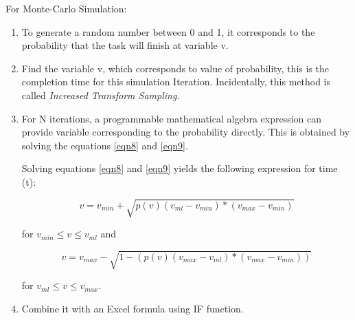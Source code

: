 For Monte-Carlo Simulation:

\begin{enumerate}
	\item To generate a random number between 0 and 1, it corresponds to the probability that the task will finish at variable {v}.
	\item Find the variable {v}, which corresponds to value of probability, this is the completion time for this simulation Iteration. Incidentally, this method is called \emph{Increased Transform Sampling}.
	\item For N iterations, a programmable mathematical algebra expression can provide variable corresponding to the probability directly. This is obtained by solving the equations \ref{eqn8} and  \ref{eqn9}.
	
	Solving equations \ref{eqn8} and  \ref{eqn9} yields the following expression for time (t):
	
	\begin{equation}
	v = v_{min} + \sqrt{ p(v) (v_{ml} - v_{min}) * (v_{max} - v_{min})}
	\label{eqn10}
	\end{equation}
	
	for $ v_{min} \leqslant v \leqslant v_{ml}$ and 
	
	\begin{equation}
	v = v_{max} - \sqrt{1 - (p(v) (v_{max} - v_{ml}) * (v_{max} - v_{min}))}
	\label{eqn11}
	\end{equation}
	
	for $ v_{ml} \leqslant v \leqslant v_{max}$. 
	
	\item Combine it with an Excel formula using IF function.
	
\end{enumerate}




